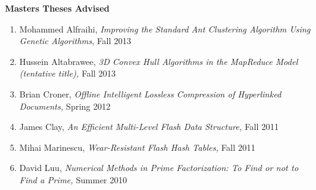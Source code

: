 \documentclass[11pt]{letter}
\begin{document}

\textbf{Masters Theses Advised}
\begin{enumerate}
\item Mohammed Alfraihi, \emph{Improving the Standard Ant Clustering Algorithm Using Genetic Algorithms}, Fall 2013
\item Hussein Altabrawee, \emph{3D Convex Hull Algorithms in the MapReduce Model (tentative title),} Fall 2013
\item Brian Croner, \emph{Offline Intelligent Lossless Compression of Hyperlinked Documents,} Spring 2012
\item James Clay, \emph{An Efficient Multi-Level Flash Data Structure,} Fall 2011
\item Mihai Marinescu, \emph{Wear-Resistant Flash Hash Tables,} Fall 2011
\item David Luu, \emph{Numerical Methods in Prime Factorization: To Find or not to Find a Prime,} Summer 2010
\end{enumerate}
\end{document}

